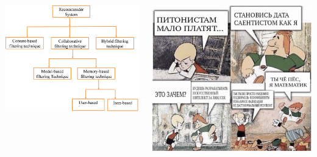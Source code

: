 \documentclass[11pt,aspectratio=169,handout]{beamer}
\begin{document}
\begin{frame}

\begin{columns}

\begin{column}{0.47\textwidth} 

\begin{center}
\includegraphics[scale=0.22]{images/taxonomy.png}
\end{center}

\end{column}

\begin{column}{0.47\textwidth} 

\begin{center}
\includegraphics[scale=0.2]{images/karlson.png}
\end{center}

\end{column}

\end{columns}

\end{frame}
\end{document}
